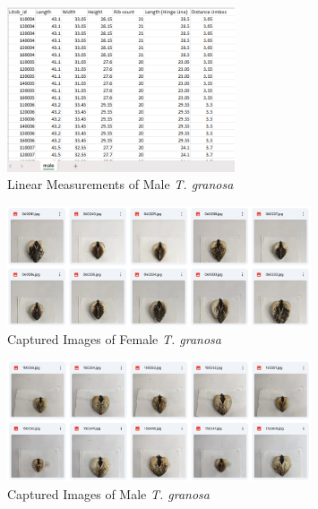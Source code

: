 \begin{figure}[!htbp]
	\centering
	\includegraphics[width=0.6\textwidth]{figures/male_dataset.png}
	\caption{Linear Measurements of Male \textit{T. granosa}}
\end{figure}

\begin{figure}[!htbp]
	\centering
	\includegraphics[width=0.8\textwidth]{figures/female_dataset(img).png}
	\caption{Captured Images of Female \textit{T. granosa}}
\end{figure}
\raggedbottom

\begin{figure}[!htbp]
	\centering
	\includegraphics[width=0.8\textwidth]{figures/male_dataset(img).png}
	\caption{Captured Images of Male \textit{T. granosa}}
\end{figure}
\raggedbottom

